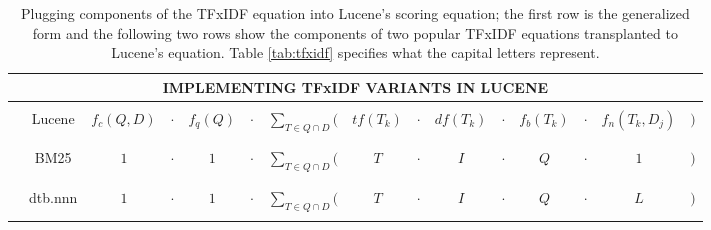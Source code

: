 \begin{table}
  \centering
  \begin{tabular}{lcccccccccccccc}
    \multicolumn{15}{c}{IMPLEMENTING TFxIDF VARIANTS IN LUCENE}
    \\
    \hline\hline
    \\
    & Lucene  & $f_{c}(Q,D)$     & $\cdot$ & $f_{q}(Q)$
    & $\cdot$ & $\displaystyle\sum_{T \in Q \cap D}($     & $tf(T_{k})$
    & $\cdot$ & $df(T_{k})$      & $\cdot$ & $f_{b}(T_{k})$
    & $\cdot$ & $f_{n}(T_{k}, D_{j})$      & $)$ \\
    \\
    \\
    & BM25    & $1$              &  $\cdot$ & $1$
    & $\cdot$ & $\displaystyle\sum_{T \in Q \cap D}($      & $T$
    & $\cdot$ & $I$              & $\cdot$  & $Q$
    & $\cdot$ & $1$              & $)$ \\
    \\
    \\
    & dtb.nnn & $1$              & $\cdot$ & $1$
    & $\cdot$ & $\displaystyle\sum_{T \in Q \cap D}($     & $T$
    & $\cdot$ & $I$              & $\cdot$ & $Q$
    & $\cdot$ & $L$              & $)$ \\
    \\
    \hline\hline
  \end{tabular}

  \caption{Plugging components of the TFxIDF equation into Lucene's
    scoring equation; the first row is the generalized form and the
    following two rows show the components of two popular TFxIDF
    equations transplanted to Lucene's equation. Table
    \ref{tab:tfxidf} specifies what the capital letters represent.}

  \label{tab:lucene}

\end{table}
